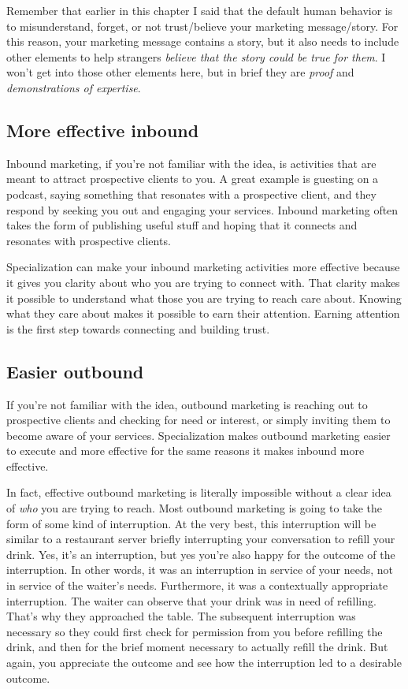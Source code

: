 Remember that earlier in this chapter I said that the default human behavior is to misunderstand, forget, or not trust/believe your marketing message/story. For this reason, your marketing message contains a story, but it also needs to include other elements to help strangers \emph{believe that the story could be true for them}. I won't get into those other elements here, but in brief they are \emph{proof} and \emph{demonstrations of expertise}.

\subsection{More effective inbound}

Inbound marketing, if you're not familiar with the idea, is activities that are meant to attract prospective clients to you. A great example is guesting on a podcast, saying something that resonates with a prospective client, and they respond by seeking you out and engaging your services. Inbound marketing often takes the form of publishing useful stuff and hoping that it connects and resonates with prospective clients.

Specialization can make your inbound marketing activities more effective because it gives you clarity about who you are trying to connect with. That clarity makes it possible to understand what those you are trying to reach care about. Knowing what they care about makes it possible to earn their attention. Earning attention is the first step towards connecting and building trust.

\subsection{Easier outbound}

If you're not familiar with the idea, outbound marketing is reaching out to prospective clients and checking for need or interest, or simply inviting them to become aware of your services. Specialization makes outbound marketing easier to execute and more effective for the same reasons it makes inbound more effective.

In fact, effective outbound marketing is literally impossible without a clear idea of \emph{who} you are trying to reach. Most outbound marketing is going to take the form of some kind of interruption. At the very best, this interruption will be similar to a restaurant server briefly interrupting your conversation to refill your drink. Yes, it's an interruption, but yes you're also happy for the outcome of the interruption. In other words, it was an interruption in service of your needs, not in service of the waiter's needs. Furthermore, it was a contextually appropriate interruption. The waiter can observe that your drink was in need of refilling. That's why they approached the table. The subsequent interruption was necessary so they could first check for permission from you before refilling the drink, and then for the brief moment necessary to actually refill the drink. But again, you appreciate the outcome and see how the interruption led to a desirable outcome.

